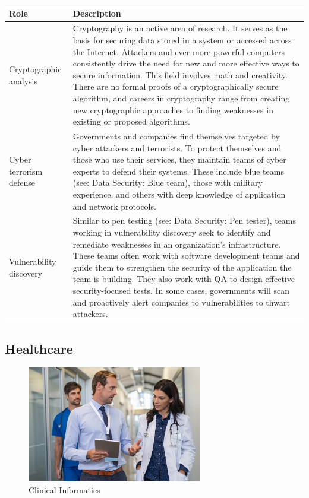 \begin{table}[H]
	\begin{center}
		\begin{tabular}{p{1in}|p{3.4in}} 
			\textbf{Role} & \textbf{Description}\\
			\hline
			Cryptographic analysis & Cryptography is an active area of research. It serves as the basis for securing data stored in a system or accessed across the Internet. Attackers and ever more powerful computers consistently drive the need for new and more effective ways to secure information. This field involves math and creativity. There are no formal proofs of a cryptographically secure algorithm, and careers in cryptography range from creating new cryptographic approaches to finding weaknesses in existing or proposed algorithms.\\
			\hline
			Cyber terrorism defense & Governments and companies find themselves targeted by cyber attackers and terrorists. To protect themselves and those who use their services, they maintain teams of cyber experts to defend their systems. These include blue teams (see: Data Security: Blue team), those with military experience, and others with deep knowledge of application and network protocols.\\
			\hline
			Vulnerability discovery & Similar to pen testing (see: Data Security: Pen tester), teams working in vulnerability discovery seek to identify and remediate weaknesses in an organization's infrastructure. These teams often work with software development teams and guide them to strengthen the security of the application the team is building. They also work with QA to design effective security-focused tests. In some cases, governments will scan and proactively alert companies to vulnerabilities to thwart attackers.\\
			\hline
		\end{tabular}
	\end{center}
\end{table}

\subsection{Healthcare}

\begin{figure}[H]
	\begin{center}
		\caption{Clinical Informatics}
		\vskip 4pt
		\includegraphics[height=2in]{images/careers/iStock-1189303763.small.jpg}
	\end{center}
\end{figure}

